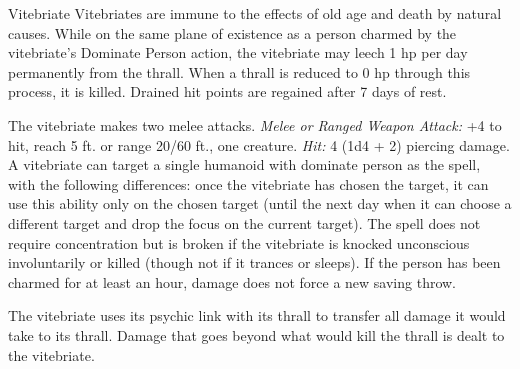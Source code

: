 \documentclass[10pt,a4paper,twoside,twocolumn,openany,bg=print,nodeprecatedcode]{dndbook}
\begin{document}
\begin{DndMonster}[float*=t]{Vitebriate}
\DndMonsterBasics[
armor-class = {14 (natural armor)},
hit-points = {\DndDice{7d8 + 21}},
speed = {30 ft.}
]
\DndMonsterAbilityScores[
 str = 11,
 dex = 14,
 con = 16,
 int = 12,
 wis = 12,
 cha = 16
]
\DndMonsterDetails[
damage-immunities = {poison},
senses = {darkvision 60 ft., passive perception 20},
languages = {languages it knew previously},
challenge = 2,
]
Vitebriates are immune to the effects of old age and death by natural causes.
While on the same plane of existence as a person charmed by the vitebriate's Dominate Person action, the vitebriate may leech 1 hp per day permanently from the thrall. When a thrall is reduced to 0 hp through this process, it is killed. Drained hit points are regained after 7 days of rest.
\par
{}
The vitebriate makes two melee attacks.
\textsl{Melee or Ranged Weapon Attack:} +4 to hit, reach 5 ft. or range 20/60 ft., one creature. \textsl{Hit:} 4 (1d4 + 2) piercing damage.
A vitebriate can target a single humanoid with dominate person as the spell, with the following differences: once the vitebriate has chosen the target, it can use this ability only on the chosen target (until the next day when it can choose a different target and drop the focus on the current target). The spell does not require concentration but is broken if the vitebriate is knocked unconscious involuntarily or killed (though not if it trances or sleeps). If the person has been charmed for at least an hour, damage does not force a new saving throw.
\par
{}
The vitebriate uses its psychic link with its thrall to transfer all damage it would take to its thrall. Damage that goes beyond what would kill the thrall is dealt to the vitebriate.
\end{DndMonster}
\end{document}
